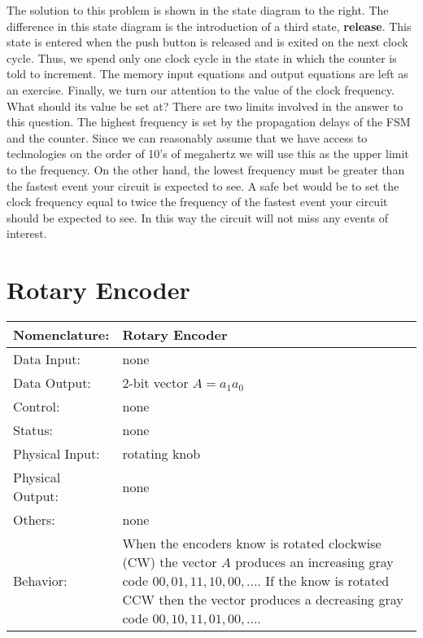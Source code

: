 The solution to this problem is shown in the state diagram to
the right.  The difference in this state diagram is the introduction
of a third state, \textbf{ release}.  This state is entered when the
push button is released and is exited on the next clock cycle.
Thus, we spend only one clock cycle in the state in which the
counter is told to increment.  The memory input equations and
output equations are left as an exercise.
Finally, we turn our attention to the value of the clock frequency.
What should its value be set at?  There are two limits involved
in the answer to this question.  The highest frequency is set by
the propagation delays of the FSM and the counter.  Since we
can reasonably assume that we have access to technologies on the
order of 10's of megahertz we will use this as the upper limit
to the frequency.  On the other hand, the lowest
frequency must be greater than the fastest event your circuit
is expected to see.  A safe bet would be to set the clock
frequency equal to twice the frequency of the fastest event your
circuit should be expected to see.   In this way the circuit
will not miss any events of interest.


\section{Rotary Encoder}
\label{page:rotary}
\begin{tabular}{|l|p{3.5in}|} \hline
Nomenclature:  & Rotary Encoder                           \\ \hline
Data Input:    & none         \\ \hline
Data Output:   & 2-bit vector $A=a_1 a_0$   \\ \hline
Control:       & none           \\ \hline
Status:        & none                                   \\ \hline
Physical Input:& rotating knob		\\ \hline
Physical Output:& none		\\ \hline
Others:        & none                   \\ \hline
Behavior:      & When the encoders know is rotated clockwise (CW) the
vector $A$ produces an increasing gray code $00, 01, 11, 10, 00, ...$.
If the know is rotated CCW then the vector produces a decreasing gray
code $00,10,11,01,00, ...$. \\ \hline
\end{tabular}

